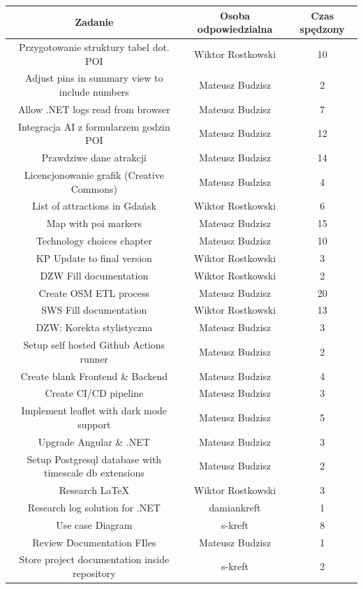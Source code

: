     \begin{table}[h!]
        \centering
        \begin{tabular}{|c|c|c|}
            \hline					
Zadanie	&	Osoba odpowiedzialna	& Czas spędzony\\
\hline
Przygotowanie struktury tabel dot. POI	&	 Wiktor Rostkowski	&	10	\\
Adjust pins in summary view to include numbers	&	Mateusz Budzisz	&	2	\\
Allow .NET logs read from browser	&	Mateusz Budzisz	&	7	\\
Integracja AI z formularzem godzin POI	&	Mateusz Budzisz	&	12	\\
Prawdziwe dane atrakcji	&	Mateusz Budzisz	&	14	\\
Licencjonowanie grafik (Creative Commons)	&	Mateusz Budzisz	&	4	\\
List of attractions in Gdańsk	&	Wiktor Rostkowski	&	6	\\
Map with poi markers	&	Mateusz Budzisz	&	15	\\
Technology choices chapter	&	Mateusz Budzisz	&	10	\\
KP Update to final version	&	Wiktor Rostkowski	&	3	\\
DZW Fill documentation	&	Wiktor Rostkowski	&	2	\\
Create OSM ETL process	&	Mateusz Budzisz	&	20	\\
SWS Fill documentation	&	Wiktor Rostkowski	&	13	\\
DZW: Korekta stylistyczna	&	Mateusz Budzisz	&	3	\\
Setup self hosted Github Actions runner	&	Mateusz Budzisz	&	2	\\
Create blank Frontend \& Backend	&	Mateusz Budzisz	&	4	\\
Create CI/CD pipeline	&	Mateusz Budzisz	&	3	\\
Implement leaflet with dark mode support	&	Mateusz Budzisz	&	5	\\
Upgrade Angular \& .NET	&	Mateusz Budzisz	&	3	\\
Setup Postgresql database with timescale db extensions	&	Mateusz Budzisz	&	2	\\
Research \LaTeX	&	Wiktor Rostkowski	&	3	\\
Research log solution for .NET	&	damiankreft	&	1	\\
Use case Diagram	&	s-kreft	&	8	\\
Review Documentation FIles	&	Mateusz Budzisz	&	1	\\
Store project documentation inside repository	&	s-kreft	&	2	\\

\end{tabular}
\end{table}
